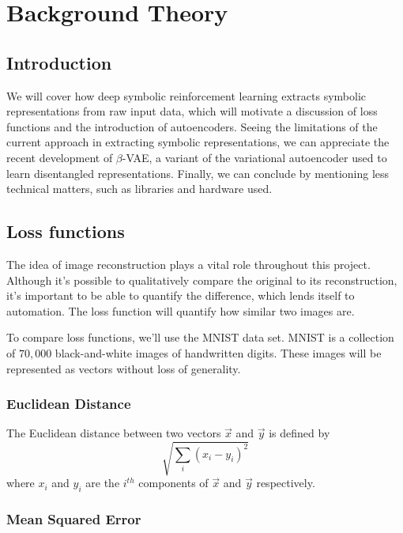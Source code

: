 \chapter{Background Theory}

\label{ch:background}

\section{Introduction}

We will cover how deep symbolic reinforcement learning extracts symbolic representations from raw input data, which will motivate a discussion of loss functions and the introduction of autoencoders. Seeing the limitations of the current approach in extracting symbolic representations, we can appreciate the recent development of $\beta$-VAE, a variant of the variational autoencoder used to learn disentangled representations. Finally, we can conclude by mentioning less technical matters, such as libraries and hardware used.

\section{Loss functions}

The idea of image reconstruction plays a vital role throughout this project. Although it's possible to qualitatively compare the original to its reconstruction, it's important to be able to quantify the difference, which lends itself to automation. The loss function will quantify how similar two images are.

To compare loss functions, we'll use the MNIST data set. MNIST is a collection of $70,000$ black-and-white images of handwritten digits. These images will be represented as vectors without loss of generality.

\subsection{Euclidean Distance}

The Euclidean distance between two vectors $\vec{x}$ and $\vec{y}$ is defined by $$\sqrt{\sum_{i}(x_i - y_i)^2}$$ where $x_i$ and $y_i$ are the $i^{th}$ components of $\vec{x}$ and $\vec{y}$ respectively.

\subsection{Mean Squared Error}

